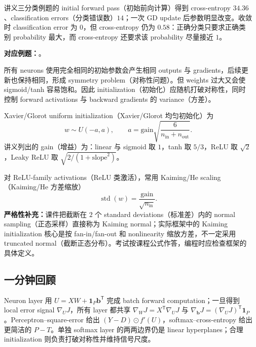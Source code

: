 讲义三分类例题的 initial forward pass（初始前向计算）得到 cross-entropy $34.36$、classification errors（分类错误数）$14$；一次 GD update 后参数明显改变。收敛时 classification error 为 $0$，但 cross-entropy 仍为 $0.58$：正确分类只要求正确类别 probability 最大，而 cross-entropy 还要求该 probability 尽量接近 $1$。

\textbf{对应例题：}。

\FloatBarrier
{}

所有 neurons 使用完全相同的初始参数会产生相同 outputs 与 gradients，后续更新也保持相同，形成 symmetry problem（对称性问题）。但 weights 过大又会使 sigmoid/tanh 容易饱和。因此 initialization（初始化）应随机打破对称性，同时控制 forward activations 与 backward gradients 的 variance（方差）。

Xavier/Glorot uniform initialization（Xavier/Glorot 均匀初始化）为
\[
  w\sim U(-a,a),
  \qquad
  \boxed{a=\mathrm{gain}\sqrt{\frac{6}{n_{\mathrm{in}}+n_{\mathrm{out}}}}}.
\]
讲义列出的 gain（增益）为：linear 与 sigmoid 取 $1$，tanh 取 $5/3$，ReLU 取 $\sqrt2$，Leaky ReLU 取 $\sqrt{2/(1+\text{slope}^2)}$。

对 ReLU-family activations（ReLU 类激活），常用 Kaiming/He scaling（Kaiming/He 方差缩放）
\[
  \operatorname{std}(w)=\frac{\mathrm{gain}}{\sqrt{n_{\mathrm{in}}}}.
\]
\textbf{严格性补充：}课件把截断在 $2$ 个 standard deviations（标准差）内的 normal sampling（正态采样）直接称为 Kaiming normal；实际框架中的 Kaiming initialization 核心是按 fan-in/fan-out 和 nonlinearity 缩放方差，不一定采用 truncated normal（截断正态分布）。考试按课程公式作答，编程时应检查框架的具体定义。

\subsection{一分钟回顾}

Neuron layer 用 $U=XW+\bm1_P\bm b^{\mathsf T}$ 完成 batch forward computation；一旦得到 local error signal $\nabla_UJ$，所有 layer 都共享 $\nabla_WJ=X^{\mathsf T}\nabla_UJ$ 与 $\nabla_{\bm b}J=(\nabla_UJ)^{\mathsf T}\bm1_P$。Perceptron--square-error 给出 $(Y-D)\odot f'(U)$，softmax--cross-entropy 给出更简洁的 $P-T$。单独 softmax layer 的两两边界仍是 linear hyperplanes；合理 initialization 则负责打破对称性并维持信号尺度。

